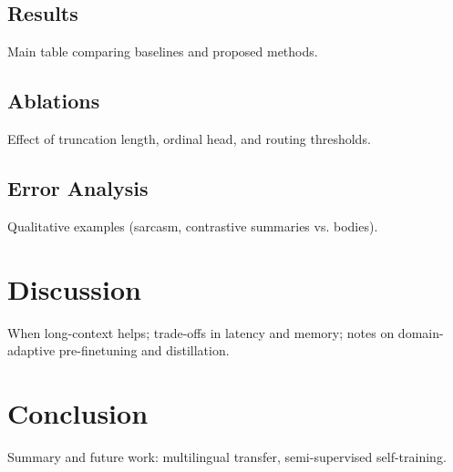 \documentclass[conference]{IEEEtran}
\begin{document}
\subsection{Results}
Main table comparing baselines and proposed methods.
\subsection{Ablations}
Effect of truncation length, ordinal head, and routing thresholds.
\subsection{Error Analysis}
Qualitative examples (sarcasm, contrastive summaries vs. bodies).

\section{Discussion}
\label{sec:discussion}
When long-context helps; trade-offs in latency and memory; notes on domain-adaptive pre-finetuning and distillation.

\section{Conclusion}
\label{sec:conclusion}
Summary and future work: multilingual transfer, semi-supervised self-training.



\end{document}
